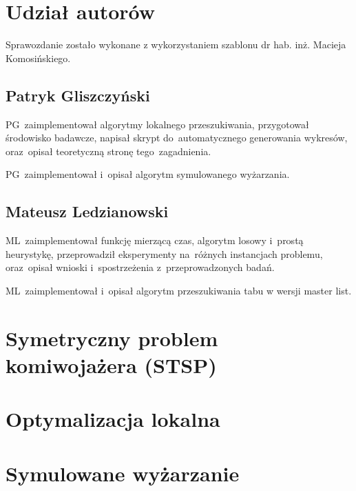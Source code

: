 \documentclass{article}
\begin{document}
\sloppy
{}



\section*{Udział autorów}

Sprawozdanie zostało wykonane z wykorzystaniem szablonu dr hab. inż. Macieja Komosińskiego. \cite{MiOIB}

\subsection*{Patryk Gliszczyński}
PG~zaimplementował algorytmy lokalnego przeszukiwania, przygotował środowisko badawcze, napisał skrypt do~automatycznego generowania wykresów, oraz~opisał teoretyczną stronę tego~zagadnienia.

PG~zaimplementował i~opisał algorytm symulowanego wyżarzania.

\subsection*{Mateusz Ledzianowski}
ML~zaimplementował funkcję mierzącą czas, algorytm losowy i~prostą heurystykę, przeprowadził eksperymenty na~różnych instancjach problemu, oraz~opisał wnioski i~spostrzeżenia z~przeprowadzonych badań.

ML~zaimplementował i~opisał algorytm przeszukiwania tabu w wersji master list.

\clearpage

\section{Symetryczny problem komiwojażera (STSP)}


\clearpage

\section{Optymalizacja lokalna}


\clearpage

\section{Symulowane wyżarzanie}
\end{document}
